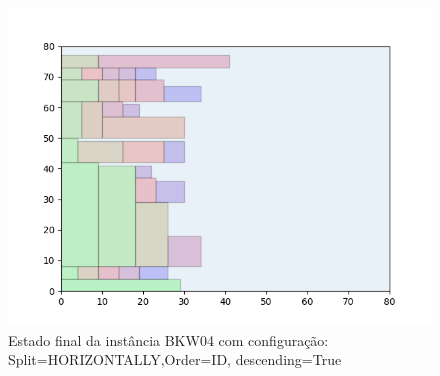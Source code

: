 \begin{figure}[H]
    \centering
    \caption[]{Estado final da instância BKW04 com configuração: Split=HORIZONTALLY,Order=ID, descending=True}
    \label{fig:bkw04-horizontally-id-true}
    \includegraphics[scale=0.5]{output/figures/bkw/bkw04/horizontally/id/true/00}
\end{figure}